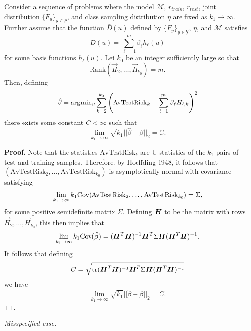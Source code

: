 \begin{theorem}
Consider a sequence of problems where the model $\mathcal{M}$,
$r_{train}$, $r_{test}$, joint distribution
$\{F_y\}_{y \in \mathcal{Y}}$, and class sampling distribution $\eta$
are fixed as $k_1 \to \infty$.  Further assume that the function
$\bar{D}(u)$ defined by $\{F_y\}_{y \in \mathcal{Y}}$, $\eta$, and
$\mathcal{M}$ satisfies
\[
\bar{D}(u) = \sum_{\ell = 1}^m \beta_\ell h_\ell(u)
\]
for some basis functions $h_\ell(u)$.
Let $k_0$ be an integer sufficiently large so that
\[
\text{Rank}(\vec{H}_2,\hdots,\vec{H}_{k_0}) = m.
\]
Then, defining
\[
\hat{\beta} = \text{argmin}_\beta \sum_{k=2}^{k_0} \left(\text{AvTestRisk}_k - \sum_{\ell=1}^m \beta_\ell H_{\ell, k}\right)^2
\]
there exists some constant $C < \infty$ such that
\[
\lim_{k_1 \to \infty} \sqrt{k_1}||\hat{\beta}-\beta||_2 = C.
\]
\end{theorem}

\textbf{Proof.}
Note that the statistics $\text{AvTestRisk}_k$ are U-statistics of the
$k_1$ pairs of test and training samples.  Therefore, by Hoeffding
1948, it follows that
$(\text{AvTestRisk}_2,\hdots, \text{AvTestRisk}_{k_0})$ is
asymptotically normal with covariance satisfying
\[
\lim_{k_1 \to \infty} k_1 \text{Cov}(\text{AvTestRisk}_2,\hdots, \text{AvTestRisk}_{k_0}) = \Sigma,
\]
for some positive semidefinite matrix $\Sigma$.  Defining $\boldsymbol{H}$ to be
the matrix with rows $\vec{H}_2,\hdots,\vec{H}_{k_0}$, this then
implies that
\[
\lim_{k_1 \to \infty} k_1 \text{Cov}(\hat{\beta}) = (\boldsymbol{H}^T \boldsymbol{H})^{-1} \boldsymbol{H}^T \Sigma \boldsymbol{H} (\boldsymbol{H}^T \boldsymbol{H})^{-1}.
\]
It follows that defining
\[
C = \sqrt{\text{tr} (\boldsymbol{H}^T \boldsymbol{H})^{-1} \boldsymbol{H}^T \Sigma \boldsymbol{H} (\boldsymbol{H}^T \boldsymbol{H})^{-1}}
\]
we have
\[
\lim_{k_1 \to \infty} \sqrt{k_1}||\hat{\beta}-\beta||_2 = C.
\]
$\Box$.

\noindent\emph{Misspecified case.}

